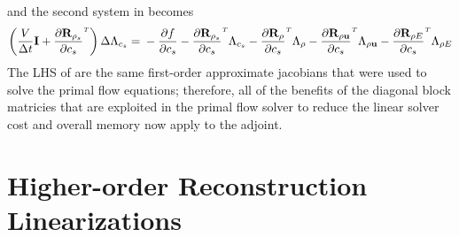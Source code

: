 and the second system in  becomes
\begin{equation}
  \left( \frac{V}{\Delta t} \mi + \rtdiff{\rho_s}{c_s} \right) \Delta
  \adjlam{c_s}
  = \\ -\pd{f}{c_s}
  - \rtdiff{\rho_s}{c_s} \adjlam{c_s}
  - \rtdiff{\rho}{c_s} \adjlam{\rho}
  - \rtdiff{\rho \vu}{c_s} \adjlam{\rho \vu}
  - \rtdiff{\rho E}{c_s} \adjlam{\rho E}
  \label{adj-dc-time2}
\end{equation}
The LHS of  are the same first-order
approximate jacobians that were used to solve the primal flow equations;
therefore, all of the benefits of the diagonal block matricies that are
exploited in the primal flow solver to reduce the linear solver cost and overall
memory now apply to the adjoint.

\section{Higher-order Reconstruction Linearizations}

